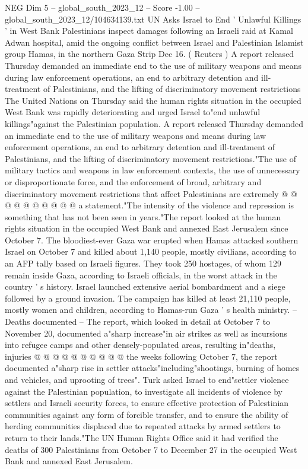 \begin{textsample}{NEG Dim 5 – global\_south\_2023\_12 – Score -1.00 – global\_south\_2023\_12/104634139.txt}  \label{ex:f5_neg_232}
UN Asks Israel to End ' Unlawful Killings ' in West Bank Palestinians inspect damages following an Israeli raid at Kamal Adwan hospital, amid the ongoing conflict between Israel and Palestinian Islamist group Hamas, in the northern Gaza Strip Dec 16. ( Reuters ) A report released Thursday demanded an immediate end to the use of military weapons and means during law enforcement operations, an end to arbitrary detention and ill-treatment of Palestinians, and the lifting of discriminatory movement restrictions The United Nations on Thursday said the human rights situation in the occupied West Bank was rapidly deteriorating and urged Israel to"end unlawful killings"against the Palestinian population.
A report released Thursday demanded an immediate end to the use of military weapons and means during law enforcement operations, an end to arbitrary detention and ill-treatment of Palestinians, and the lifting of discriminatory movement restrictions."The use of military tactics and weapons in law enforcement contexts, the use of unnecessary or disproportionate force, and the enforcement of broad, arbitrary and discriminatory movement restrictions that affect Palestinians are extremely @ @ @ @ @ @ @ @ @ @ a statement."The intensity of the violence and repression is something that has not been seen in years."The report looked at the human rights situation in the occupied West Bank and annexed East Jerusalem since October 7.
The bloodiest-ever Gaza war erupted when Hamas attacked southern Israel on October 7 and killed about 1,140 people, mostly civilians, according to an AFP tally based on Israeli figures.
They took 250 hostages, of whom 129 remain inside Gaza, according to Israeli officials, in the worst attack in the country ' s history.
Israel launched extensive aerial bombardment and a siege followed by a ground invasion.
The campaign has killed at least 21,110 people, mostly women and children, according to Hamas-run Gaza ' s health ministry. -- Deaths documented -- The report, which looked in detail at October 7 to November 20, documented a"sharp increase"in air strikes as well as incursions into refugee camps and other densely-populated areas, resulting in"deaths, injuries @ @ @ @ @ @ @ @ @ @ the weeks following October 7, the report documented a"sharp rise in settler attacks"including"shootings, burning of homes and vehicles, and uprooting of trees".
Turk asked Israel to end"settler violence against the Palestinian population, to investigate all incidents of violence by settlers and Israeli security forces, to ensure effective protection of Palestinian communities against any form of forcible transfer, and to ensure the ability of herding communities displaced due to repeated attacks by armed settlers to return to their lands."The UN Human Rights Office said it had verified the deaths of 300 Palestinians from October 7 to December 27 in the occupied West Bank and annexed East Jerusalem.

\end{textsample}
